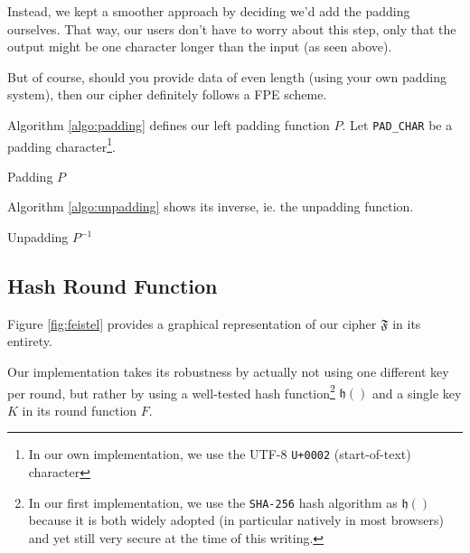 \documentclass[twoside,twocolumn]{article}
\newcommand{\mod}[1]{\ \mathrm{mod}\ #1}
\theoremstyle{definition}
\theoremstyle{remark}
\begin{document}
Instead, we kept a smoother approach by deciding we'd add the padding ourselves. That way, our users don't have to worry about this step, only that the 
output might be one character longer than the input (as seen above).

But of course, should you provide data of even length (using your own padding system), then our cipher definitely follows a FPE scheme.

Algorithm \ref{algo:padding} defines our left padding function $P$.
Let \texttt{PAD\_CHAR} be a padding character\footnote{In our own implementation, we use the UTF-8 \texttt{U+0002} (start-of-text) character}.
\begin{algorithm}
    \eIf{$|m| \mod 2 = 0$}{
        \Return{$m$}
    }{
        \Return{\emph{\texttt{PAD\_CHAR}} $\mathbin\Vert m$}
    }
    \caption{Padding $P$}
    \label{algo:padding}
\end{algorithm}

Algorithm \ref{algo:unpadding} shows its inverse, ie. the unpadding function.

\begin{algorithm}
    \caption{Unpadding $P^{-1}$}
    \label{algo:unpadding}
\end{algorithm}

\subsection{Hash Round Function}
\label{roundFunction}

Figure \ref{fig:feistel} provides a graphical representation of our cipher $\mathfrak{F}$ in its entirety.

Our implementation takes its robustness by actually not using one different key per round, but rather by using a well-tested hash function\footnote{
    In our first implementation, we use the \texttt{SHA-256} hash algorithm as $\mathfrak{h}()$ because it is both widely adopted (in particular 
    natively in most browsers) and yet still very secure at the time of this writing.
} $\mathfrak{h}()$ and a single key $K$ in its round function $F$.
\end{document}
